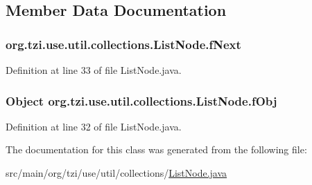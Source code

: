 \subsection{Member Data Documentation}
\hypertarget{classorg_1_1tzi_1_1use_1_1util_1_1collections_1_1_list_node_a3d0b7278524278d7ec4d9564e672f206}{
\subsubsection[{f\-Next}]{ org.\-tzi.\-use.\-util.\-collections.\-List\-Node.\-f\-Next\hspace{0.3cm}{\ttfamily [protected]}}}\label{classorg_1_1tzi_1_1use_1_1util_1_1collections_1_1_list_node_a3d0b7278524278d7ec4d9564e672f206}


Definition at line 33 of file List\-Node.\-java.

\hypertarget{classorg_1_1tzi_1_1use_1_1util_1_1collections_1_1_list_node_a7b4ea96da1442b8bedcc743b95e17ab5}{
\subsubsection[{f\-Obj}]{\setlength{\rightskip}{0pt plus 5cm}Object org.\-tzi.\-use.\-util.\-collections.\-List\-Node.\-f\-Obj\hspace{0.3cm}{\ttfamily [protected]}}}\label{classorg_1_1tzi_1_1use_1_1util_1_1collections_1_1_list_node_a7b4ea96da1442b8bedcc743b95e17ab5}


Definition at line 32 of file List\-Node.\-java.



The documentation for this class was generated from the following file\-:\begin{DoxyCompactItemize}
\item 
src/main/org/tzi/use/util/collections/\hyperlink{_list_node_8java}{List\-Node.\-java}\end{DoxyCompactItemize}
